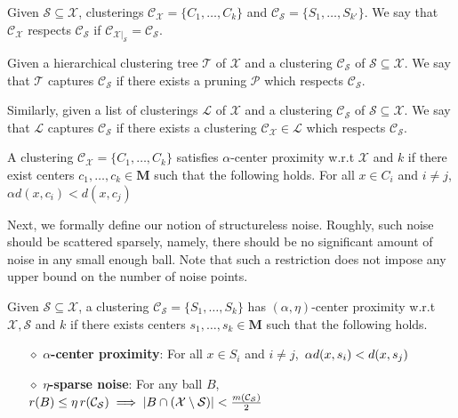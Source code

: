 \documentclass[orivec]{llncs}
\newcommand{\mc}{\mathcal}
\newcommand{\mb}{\mathbf}
\begin{document}
\begin{definition}[$\mc C_{\mc X}$ respects $\mc C_{\mc S}$] Given $\mc S \subseteq \mc X$, clusterings $\mc C_{\mc X} = \{C_1, \ldots, C_k\}$ and $\mc C_{\mc S} = \{S_1, \ldots, S_{k'}\}$. We say that $\mc C_{\mc X}$ respects $\mc C_{\mc S}$ if $\mc C_{{\mc X}|_{\mc S}} = \mc C_{\mc S}$.
\end{definition}

\begin{definition}[$\mc T$ or $\mc L$ captures $\mc C_{\mc S}$]Given a hierarchical clustering tree $\mc T$ of $\mc X$ and a clustering $\mc C_{\mc S}$ of $\mc S \subseteq \mc X$.  We say that $\mc T$ captures $\mc C_{\mc S}$ if there exists a pruning $\mc P$ which respects $\mc C_{\mc S}$. 

Similarly, given a list of clusterings $\mc L$ of $\mc X$ and a clustering $\mc C_{\mc S}$ of $\mc S \subseteq \mc X$. We say that $\mc L$ captures $\mc C_{\mc S}$ if there exists a clustering $\mc C_{\mc X} \in \mc L$ which respects $\mc C_{\mc S}$. 
\end{definition}

\begin{definition}
\label{defn:alphacp}
A clustering $\mc C_{\mc X} = \{C_1, \ldots, C_k\}$ satisfies $\alpha$-center proximity w.r.t $\mc X$ and $k$ if there exist centers $c_1, \ldots, c_k \in \mb M$  such that the following holds. For all $x \in C_i$ and $i\neq j$, $\alpha d(x, c_i) < d(x, c_j)$
\end{definition}

Next, we formally define our notion of structureless noise. Roughly, such noise should be scattered sparsely, namely, there should be no significant amount of noise in any small enough ball. Note that such a restriction does not impose any upper bound on the number of noise points.

\begin{definition}
\label{def:alphaeta}
Given $\mc S \subseteq \mc X$, a clustering $\mc C_{\mc S} = \{S_1, \ldots, S_k\}$ has $(\alpha, \eta)$-center proximity w.r.t $\mc X, \mc S$ and $k$ if there exists centers $s_1, \ldots, s_k \in \mb M$  such that the following holds.
\begin{itemize}[nolistsep, noitemsep]
\label{defn:alphacpnoise}	

\item[$\diamond$] {\bf $\alpha$-center proximity}: For all $x \in S_i$ and $i\neq j$, $\thinspace\alpha d(x, s_i) < d(x, s_j)$
\item[$\diamond$]{\bf $\eta$-sparse noise}: For any ball $B$, $r(B)\leq \eta \thinspace r(\mc{C}_{\mc S}) \implies |B\cap (\mc X\setminus \mc S)| < \frac{m(\mc C_{\mc S})}{2}$
\end{itemize}
\end{definition}
\end{document}

